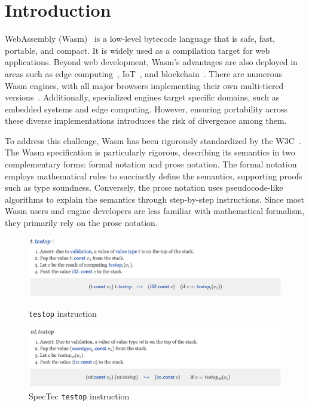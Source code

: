 
\chapter{Introduction}
\label{ch:intro}
\noindent

WebAssembly (Wasm)~\cite{wasm} is a low-level bytecode language that is safe, fast,
portable, and compact.
It is widely used as a compilation target for web applications.
Beyond web development, Wasm's advantages are also deployed in areas such as
edge computing~\cite{wasm-edge}, IoT~\cite{wasm-iot}, and
blockchain~\cite{wasm-block}.
There are numerous Wasm engines, with all major browsers implementing their own
multi-tiered versions~\cite{v8, spidermonkey, webkit}.
Additionally, specialized engines target specific domains, such as embedded
systems and edge computing.
However, ensuring portability across these diverse implementations introduces
the risk of divergence among them.


To address this challenge, Wasm has been rigorously standardized by the
W3C~\cite{wasm-w3c}.
The Wasm specification is particularly rigorous, describing its semantics in
two complementary forms: formal notation and prose notation.
The formal notation employs mathematical rules to succinctly define the
semantics, supporting proofs such as type soundness.
Conversely, the prose notation uses pseudocode-like algorithms to explain the
semantics through step-by-step instructions.
Since most Wasm users and engine developers are less familiar with mathematical
formalism, they primarily rely on the prose notation.

\begin{figure}[t]
    \centerline{\includegraphics[width=15cm]{fig/testop}}
    \caption[Enter the caption title here]{\texttt{testop} instruction} \label{fig:testop}
    \centerline{\includegraphics[width=15cm]{fig/spectec-testop}}
    \caption[Enter the caption title here]{SpecTec \texttt{testop} instruction} \label{fig:spectec-testop}
\end{figure}


